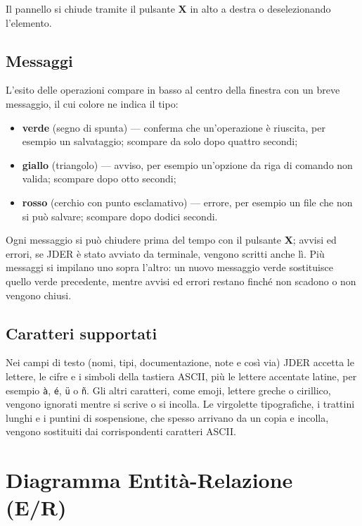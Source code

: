 \documentclass[a4paper,11pt]{article}
\newcommand\mediumweight{\fontseries{mb}\selectfont}
\newcommand\currenticon{book}
\newcommand\tocicon{book}
\newcommand\sectionicon[1]{%
  \renewcommand\currenticon{#1}%
  \addtocontents{toc}{\gdef\protect\tocicon{#1}}}
\newcommand\jder{{\mediumweight JDER}}
\begin{document}
Il pannello si chiude tramite il pulsante \textbf{X} in alto a destra o deselezionando
l'elemento.

\subsection{Messaggi}
\label{sec:messaggi}

L'esito delle operazioni compare in basso al centro della finestra con un breve messaggio, il cui
colore ne indica il tipo:

\begin{itemize}
  \item \textbf{verde} (segno di spunta) --- conferma che un'operazione è riuscita, per esempio un
        salvataggio; scompare da solo dopo quattro secondi;
  \item \textbf{giallo} (triangolo) --- avviso, per esempio un'opzione da riga di comando non
        valida; scompare dopo otto secondi;
  \item \textbf{rosso} (cerchio con punto esclamativo) --- errore, per esempio un file che non si
        può salvare; scompare dopo dodici secondi.
\end{itemize}

Ogni messaggio si può chiudere prima del tempo con il pulsante \textbf{X}; avvisi ed errori, se
\jder{} è stato avviato da terminale, vengono scritti anche lì. Più messaggi si impilano uno sopra
l'altro: un nuovo messaggio verde sostituisce quello verde precedente, mentre avvisi ed errori
restano finché non scadono o non vengono chiusi.

\subsection{Caratteri supportati}

Nei campi di testo (nomi, tipi, documentazione, note e così via) \jder{} accetta le lettere, le
cifre e i simboli della tastiera ASCII, più le lettere accentate latine, per esempio
\texttt{à}, \texttt{é}, \texttt{ü} o \texttt{ñ}. Gli altri caratteri, come emoji, lettere greche
o cirillico, vengono ignorati mentre si scrive o si incolla. Le virgolette tipografiche, i
trattini lunghi e i puntini di sospensione, che spesso arrivano da un copia e incolla, vengono
sostituiti dai corrispondenti caratteri ASCII.

\sectionicon{er}
\section{Diagramma Entità-Relazione (E/R)}
\label{sec:er}
\end{document}
